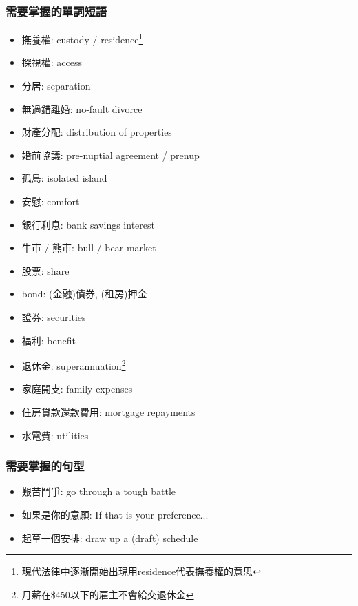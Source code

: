 \subsubsection*{需要掌握的單詞短語}
\begin{multicols}{2}
\begin{itemize}
  \itemsep0em
  \item 撫養權: custody / residence\footnote{現代法律中逐漸開始出現用residence代表撫養權的意思}
  \item 探視權: access
  \item 分居: separation
  \item 無過錯離婚: no-fault divorce
  \item 財產分配: distribution of properties
  \item 婚前協議: pre-nuptial agreement / prenup
  \item 孤島: isolated island
  \item 安慰: comfort
  \item 銀行利息: bank savings interest
  \item 牛市 / 熊市: bull / bear market
  \item 股票: share
  \item bond: (金融)債券, (租房)押金
  \item 證券: securities
  \item 福利: benefit
  \item 退休金: superannuation\footnote{月薪在\$450以下的雇主不會給交退休金}
  \item 家庭開支: family expenses
  \item 住房貸款還款費用: mortgage repayments
  \item 水電費: utilities
\end{itemize}
\end{multicols}

\subsubsection*{需要掌握的句型}
\begin{multicols}{2}
\begin{itemize}
  \itemsep0em
  \item 艱苦鬥爭: go through a tough battle
  \item 如果是你的意願: If that is your preference...
  \item 起草一個安排: draw up a (draft) schedule
\end{itemize}
\end{multicols}

